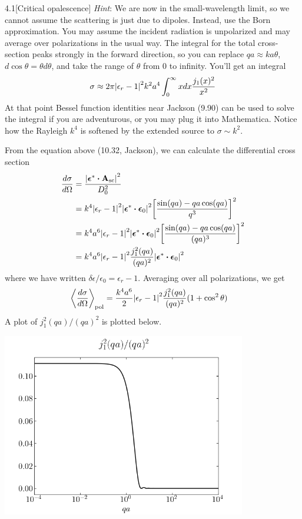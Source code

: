 \documentclass[12pt]{article}
\begin{document}
\begin{problem}{4.1}[Critical opalescence]
\textit{Hint}: We are now in the small-wavelength limit, so we cannot assume the
scattering is just due to dipoles. Instead, use the Born approximation. You may
assume the incident radiation is unpolarized and may average over polarizations
in the usual way. The integral for the total cross-section peaks strongly in the
forward direction, so you can replace $qa\approx ka\theta$, $d\cos\theta=\theta
d\theta$, and take the range of $\theta$ from 0 to infinity. You'll get an
integral
\begin{equation}
    \sigma\approx 2\pi\abs{\epsilon_r-1}^2k^2a^4\int_0^\infty
        xdx\frac{j_1(x)^2}{x^2}
\end{equation}
At that point Bessel function identities near Jackson (9.90) can be used to
solve the integral if you are adventurous, or you may plug it into Mathematica.
Notice how the Rayleigh $k^4$ is softened by the extended source to $\sigma\sim
k^2$.
\begin{solution}
From the equation above (10.32, Jackson), we can calculate the differential
cross section
\begin{align}
    \frac{d\sigma}{d\Omega}
    &=\frac{\abs{\bm\epsilon^\ast\vdot\vb{A}_\text{sc}}^2}{D_0^2}\notag\\
    &=k^4\abs{\epsilon_r-1}^2\abs{\bm\epsilon^\ast\vdot\bm\epsilon_0}^2
    \qty[\frac{\sin(qa)-qa\cos(qa)}{q^3}]^2\notag\\
    &=
    k^4a^6\abs{\epsilon_r-1}^2\abs{\bm\epsilon^\ast\vdot\bm\epsilon_0}^2\qty[\frac{\sin(qa)-qa\cos(qa)}{(qa)^3}]^2\notag\\
    &=k^4a^6\abs{\epsilon_r-1}^2\frac{j_1^2(qa)}{(qa)^2}\abs{\bm\epsilon^\ast\vdot\bm\epsilon_0}^2
\end{align}
where we have written $\delta\epsilon/\epsilon_0=\epsilon_r-1$. Averaging over
all polarizations, we get
\begin{align}
    \expval{\frac{d\sigma}{d\Omega}}_\text{pol}
    &=\frac{k^4a^6}{2}\abs{\epsilon_r-1}^2\frac{j_1^2(qa)}{(qa)^2}(1+\cos^2\theta)
\end{align}
A plot of $j_1^2(qa)/(qa)^2$ is plotted below.
\begin{center}
    \includegraphics[width=0.8\textwidth]{p1.png} 

\end{center}
\end{solution}
\end{problem}
\end{document}
